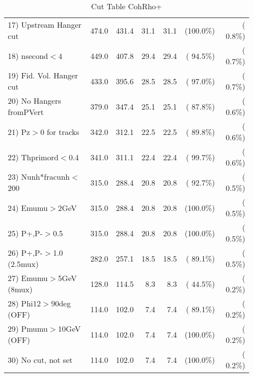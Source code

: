 \begin{table}[h!]
\begin{tabular}{||l||r|r|r|r|r|r||}
 17) Upstream Hanger cut  &        474.0 &        431.4 &         31.1 &         31.1 & (100.0\%) & (  0.8\%) \\
 18) nsecond$<$4          &        449.0 &        407.8 &         29.4 &         29.4 & ( 94.5\%) & (  0.7\%) \\
 19) Fid. Vol. Hanger cut &        433.0 &        395.6 &         28.5 &         28.5 & ( 97.0\%) & (  0.7\%) \\
 20) No Hangers fromPVert &        379.0 &        347.4 &         25.1 &         25.1 & ( 87.8\%) & (  0.6\%) \\
 21) Pz$>$0 for tracks    &        342.0 &        312.1 &         22.5 &         22.5 & ( 89.8\%) & (  0.6\%) \\
 22) Thprimord$<$0.4      &        341.0 &        311.1 &         22.4 &         22.4 & ( 99.7\%) & (  0.6\%) \\
 23) Nunh*fracunh$<$200   &        315.0 &        288.4 &         20.8 &         20.8 & ( 92.7\%) & (  0.5\%) \\
 24) Emumu$>$2GeV         &        315.0 &        288.4 &         20.8 &         20.8 & (100.0\%) & (  0.5\%) \\
 25) P+,P-$>$0.5          &        315.0 &        288.4 &         20.8 &         20.8 & (100.0\%) & (  0.5\%) \\
 26) P+,P-$>$1.0 (2.5mux) &        282.0 &        257.1 &         18.5 &         18.5 & ( 89.1\%) & (  0.5\%) \\
 27) Emumu$>$5GeV  (8mux) &        128.0 &        114.5 &          8.3 &          8.3 & ( 44.5\%) & (  0.2\%) \\
 28) Phi12$>$90deg  (OFF) &        114.0 &        102.0 &          7.4 &          7.4 & ( 89.1\%) & (  0.2\%) \\
 29) Pmumu$>$10GeV  (OFF) &        114.0 &        102.0 &          7.4 &          7.4 & (100.0\%) & (  0.2\%) \\
 30) No cut, not set      &        114.0 &        102.0 &          7.4 &          7.4 & (100.0\%) & (  0.2\%) \\
 \hline
 \hline
 \end{tabular}
 \caption{Cut Table  CohRho+  }
 \label{tab-cutcohjpsi-mumu_anumunc}
 \end{table}

